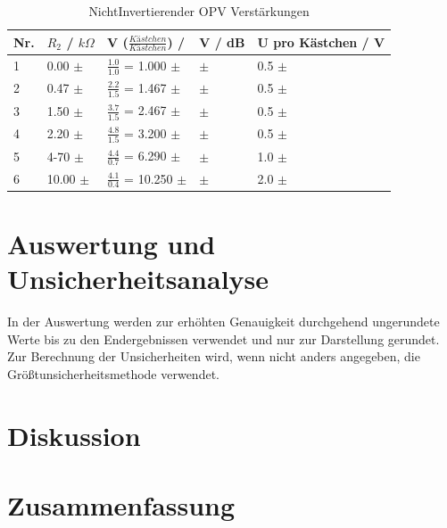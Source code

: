 \documentclass[12pt,a4paper,twoside]{article}
\begin{document}
\begin{table}[H]
    \centering
    \caption{NichtInvertierender OPV Verstärkungen}
    \label{tab:NioVerstärkungenGemessen}
    \begin{tabular}{| l | l | l | l | l |}
        \hline
        Nr. & $R_{2}$ / $k \Omega$ & V ($\frac{Kästchen}{Kästchen}$) / & V / dB & U pro Kästchen / V \\
        \hline
        1 &  0.00 $\pm$  & $\frac{1.0}{1.0}$ =  1.000 $\pm$  &  $\pm$  & 0.5 $\pm$  \\
        2 &  0.47 $\pm$  & $\frac{2.2}{1.5}$ =  1.467 $\pm$  &  $\pm$  & 0.5 $\pm$  \\
        3 &  1.50 $\pm$  & $\frac{3.7}{1.5}$ =  2.467 $\pm$  &  $\pm$  & 0.5 $\pm$  \\
        4 &  2.20 $\pm$  & $\frac{4.8}{1.5}$ =  3.200 $\pm$  &  $\pm$  & 0.5 $\pm$  \\
        5 &  4-70 $\pm$  & $\frac{4.4}{0.7}$ =  6.290 $\pm$  &  $\pm$  & 1.0 $\pm$  \\
        6 & 10.00 $\pm$  & $\frac{4.1}{0.4}$ = 10.250 $\pm$  &  $\pm$  & 2.0 $\pm$  \\
        \hline
    \end{tabular}
\end{table}



\section{Auswertung und Unsicherheitsanalyse} %

In der Auswertung werden zur erhöhten Genauigkeit durchgehend ungerundete Werte bis zu den Endergebnissen verwendet und nur zur Darstellung gerundet. \\
Zur Berechnung der Unsicherheiten wird, wenn nicht anders angegeben, die Größtunsicherheitsmethode verwendet.


\section{Diskussion} %


\section{Zusammenfassung} %


\printbibliography[heading=bibintoc]
\end{document}
